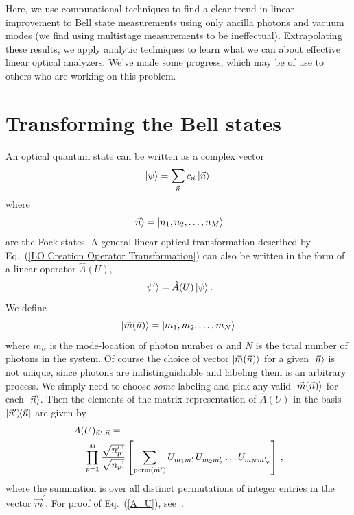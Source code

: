 \documentclass[aps,pra,twocolumn,showpacs,superscriptaddress,floatfix,10pt]{revtex4}
\begin{document}
Here, we use computational techniques to find a clear trend in linear improvement to Bell state measurements using only ancilla photons and vacuum modes (we find using multistage measurements to be ineffectual). Extrapolating these results, we apply analytic techniques to learn what we can about effective linear optical analyzers. We've made some progress, which may be of use to others who are working on this problem.
\section{Transforming the Bell states}
An optical quantum state can be written as a complex vector
\begin{equation}
\label{LO State Fock Vec Basis}
\ket{\psi} = \sum_{\vec{n}} c_{\vec{n}} \ket{\vec{n}} \,
\end{equation}
where
\begin{equation}
\ket{\vec{n}} = \ket{n_1,n_2,\dots,n_M}
\end{equation}
are the Fock states. A general linear optical transformation described by Eq.~(\ref{LO Creation Operator Transformation}) can also be written in the form of a linear operator $\hat{A}(U)$,
\begin{equation}
	\ket{\psi^\prime} = \hat{A}(U) \ket{\psi}.
\end{equation}
We define
\begin{equation}
\label{m definition}
\ket{\vec{m}(\vec{n})} = \ket{m_1,m_2,\dots,m_N}
\end{equation}
where $m_\alpha$ is the mode-location of photon number $\alpha$ and $N$ is the total number of photons in the system. Of course the choice of vector $\ket{\vec{m}(\vec{n})}$ for a given $\ket{\vec{n}}$ is not unique, since photons are indistinguishable and labeling them is an arbitrary process. We simply need to choose \textit{some} labeling and pick any valid $\ket{\vec{m}(\vec{n})}$ for each $\ket{\vec{n}}$. Then the elements of the matrix representation of $\hat{A}(U)$ in the basis $\outerproduct{\vec{n}^\prime}{\vec{n}}$ are given by
\begin{eqnarray}
\label{A_U}
A(U)_{\vec{n}^\prime,\vec{n}} = \quad \quad \quad \quad \quad \quad \quad \quad \quad \quad \quad \quad \quad \quad \quad \quad \quad \\ \small \nonumber \prod_{p=1}^{M} \frac{\sqrt{n_p^\prime !}}{\sqrt{n_p !}} \left[\sum_{\textrm{perm}(\vec{m}^\prime)} U_{m_1 m_1^\prime} U_{m_2 m_2^\prime} \dots U_{m_N m_N^\prime} \right] \,,
\end{eqnarray}
where the summation is over all distinct permutations of integer entries in the vector $\vec{m}^\prime$. For proof of Eq.~(\ref{A_U}), see~\cite{Jake Smith}.
\end{document}

